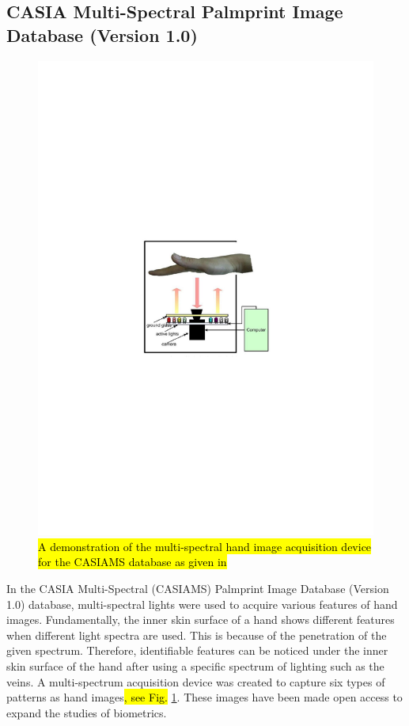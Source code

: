 \documentclass[review]{elsarticle}
\begin{document}
\subsection{CASIA Multi-Spectral Palmprint Image Database (Version 1.0)} 
		\begin{figure}[!b]
			\centering
			\includegraphics[page=1,scale=1.4,trim=6cm 11.1cm 6cm 10.8cm,clip]{CASIA_acquisition.pdf}
			\caption{\hl{A demonstration of the multi-spectral hand image acquisition device for the CASIAMS database as given in} \cite{CASIAMS-PalmprintV1}}
			\label{fig:CASIA_acquisition}
		\end{figure}
	In the CASIA Multi-Spectral (CASIAMS) Palmprint Image Database (Version 1.0) database, multi-spectral lights were used to acquire various features of hand images. Fundamentally, the inner skin surface of a hand shows different features when different light spectra are used. This is because of the penetration of the given spectrum. Therefore, identifiable features can be noticed under the inner skin surface of the hand after using a specific spectrum of lighting such as the veins. A multi-spectrum acquisition device was created to capture six types of patterns as hand images\hl{, see Fig.} \ref{fig:CASIA_acquisition}. 
	These images have been made open access to expand the studies of biometrics. 
\end{document}
